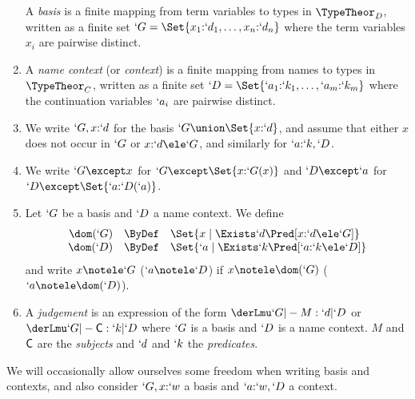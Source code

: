 \documentclass{lmcs}
\begin{document}
 \begin{defi} 

 \begin{enumerate}

 \firstitem
A \emph{basis} is a finite mapping from term variables to types in $\TypeTheor_D$, written as a finite set $`G = \Set{x_1{:}`d_1, \ldots,x_n{:}`d_n}$ where the term variables $x_i$ are pairwise distinct.

 \item
A \emph{name context} (or \emph{context}) is a finite mapping from names to types in $\TypeTheor_C$, written as a finite set $`D = \Set{`a_1{:}`k_1, \ldots, `a_m{:}`k_m}$ where the continuation variables $`a_i$ are pairwise distinct.

 \item
We write $`G,x{:}`d$ for the basis $`G \union \Set{x{:}`d}$, and assume that either $x$ does not occur in $`G$ or $x{:}`d \ele `G$, and similarly for $`a{:}`k,`D $.

 \item
We write $`G \except x $ for $`G \except \Set{x{:}`G(x)}$ and $`D \except `a$ for $`D \except \Set{`a{:}`D(`a)}$.

 \item \label{def:ext-leq-i}
Let $`G$ be a basis and $`D $ a name context. We define 
%
 \[ \begin{array}{rcl}
 \dom(`G) &\ByDef& \Set{x \mid \Exists `d  \Pred[ x{:}`d \ele `G] }
 \\ %
 \dom(`D) &\ByDef& \Set{`a \mid \Exists `k  \Pred[ `a{:}`k \ele `D] }
 \end{array} \]
and write $x \notele `G$ ($`a \notele `D $) if $x \notele \dom(`G)$ ($`a \notele \dom(`D)$).

 \item
A \emph{judgement} is an expression of the form $ \derLmu `G |- M : `d | `D $ or $ \derLmu `G |- {\Cmd} : `k | `D $ where $`G$ is a basis and $`D $ is a name context.
$M$ and $\textrm{\sf C}$ are the \emph{subjects} and $`d$ and $`k$ the \emph{predicates}.

 \end{enumerate}
 \end{defi}
\noindent
We will occasionally allow ourselves some freedom when writing basis and contexts, and also consider $`G,x{:}`w$ a basis and $`a{:}`w,`D $ a context.
\end{document}
